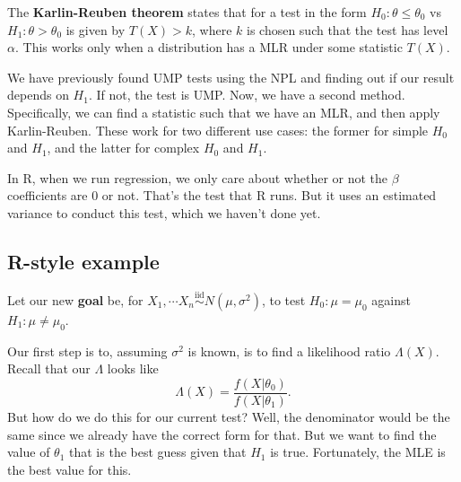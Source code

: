 \documentclass[titlepage, 12pt, leqno]{article}
\begin{document}
\begin{definition}
    The \textbf{Karlin-Reuben theorem} states that for a test in the form
    $H_{0}:\theta \le \theta_{0}$ vs $H_{1}:\theta > \theta_{0}$ is given by
    $T(X) > k$, where $k$ is chosen such that the test has level $\alpha$. This
    works only when a distribution has a MLR under some statistic $T(X)$.
\end{definition}

We have previously found UMP tests using the NPL and finding out if our
result depends on $H_{1}$. If not, the test is UMP. Now, we have a second 
method. Specifically, we can find a statistic such that we have an MLR, and
then apply Karlin-Reuben. These work for two different use cases: the former
for simple $H_{0}$ and $H_{1}$, and the latter for complex $H_{0}$ and $H_{1}$.

In R, when we run regression, we only care about whether or not the $\beta$ 
coefficients are 0 or not. That's the test that R runs. But it uses an estimated
variance to conduct this test, which we haven't done yet.

\subsection{R-style example}

Let our new \textbf{goal} be, for $X_{1}, \cdots X_{n}
\overset{\mathrm{iid}}{\sim}N(\mu, \sigma^{2})$, to test $H_{0}: \mu = \mu_{0}$
against $H_{1}: \mu \ne \mu_{0}$.

Our first step is to, assuming $\sigma^{2}$ is known, is to find a likelihood
ratio $\Lambda(X)$. Recall that our $\Lambda$ looks like
\[
\Lambda(X) = \frac{f(X|\theta_{0})}{f(X|\theta_{1})}.
\]
But how do we do this for our current test? Well, the denominator would be
the same since we already have the correct form for that. But we want to find
the value of $\theta_{1}$ that is the best guess given that $H_{1}$ is true.
Fortunately, the MLE is the best value for this.
\end{document}
